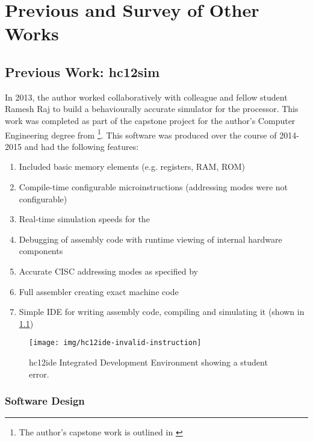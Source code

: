 \chapter{Previous and Survey of Other Works}
\label{ch:prev-other-work}

\section{Previous Work: hc12sim}
\label{sec:review-prev-hc12}

In 2013, the author worked collaboratively with colleague and fellow student Ramesh Raj to build a behaviourally accurate simulator for the \hcmodel{} processor. This work was completed as part of the capstone project for the author's Computer Engineering degree from \uwo{}\footnote{The author's capstone work is outlined in \cite{Brightwell2013}}. This software was produced over the course of 2014-2015 and had the following features: 

\begin{enumerate}
    \item Included basic memory elements (e.g. registers, RAM, ROM)
    \item Compile-time configurable microinstructions (addressing modes were not configurable)
    \item Real-time simulation speeds for the \hcmodel{}
    \item Debugging of assembly code with runtime viewing of internal hardware components
    \item Accurate CISC addressing modes as specified by \hcmodel{}
    \item Full assembler creating exact machine code
    \item Simple IDE for writing \hcmodel{} assembly code, compiling and simulating it (shown in \cref{fig:hc12ide-invalid-instruction})
\end{enumerate}

\begin{figure}[!ht]
    \centering
    \texttt{[image: img/hc12ide-invalid-instruction]}
    \caption{hc12ide Integrated Development Environment showing a student error.}
    \label{fig:hc12ide-invalid-instruction}
\end{figure}

\subsection{Software Design}

